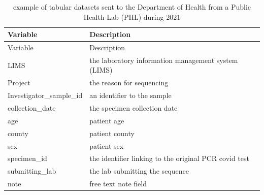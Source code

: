 \documentclass[
]{agujournal2019}
\begin{document}
\begin{longtable}[]{@{}
  >{\raggedright\arraybackslash}p{}
  >{\raggedright\arraybackslash}p{}@{}}
\caption{example of tabular datasets sent to the Department of Health
from a Public Health Lab (PHL) during
2021}\label{tbl-tabdata2}\tabularnewline
\toprule\noalign{}
\begin{minipage}[b]{\linewidth}\raggedright
Variable
\end{minipage} & \begin{minipage}[b]{\linewidth}\raggedright
Description
\end{minipage} \\
\midrule\noalign{}
\endfirsthead
\toprule\noalign{}
\begin{minipage}[b]{\linewidth}\raggedright
Variable
\end{minipage} & \begin{minipage}[b]{\linewidth}\raggedright
Description
\end{minipage} \\
\midrule\noalign{}
\endhead
\bottomrule\noalign{}
\endlastfoot
LIMS & the laboratory information management system (LIMS) \\
Project & the reason for sequencing \\
Investigator\_sample\_id & an identifier to the sample \\
collection\_date & the specimen collection date \\
age & patient age \\
county & patient county \\
sex & patient sex \\
specimen\_id & the identifier linking to the original PCR covid test \\
submitting\_lab & the lab submitting the sequence \\
note & free text note field \\
\end{longtable}
\end{document}
